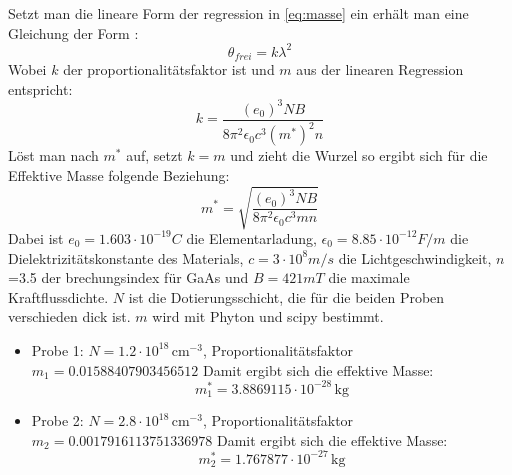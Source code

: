 Setzt man die lineare Form der regression in \eqref{eq:masse} ein erhält man eine Gleichung der Form :
\begin{equation}
    \theta_{frei}=k\lambda^2
\end{equation}
Wobei $k$ der proportionalitätsfaktor ist und $m$ aus der linearen Regression entspricht:
\begin{equation}
    k=\frac{(e_0)^3NB}{8\pi^2\epsilon_0 c^3(m^*)^2 n}
\end{equation}
Löst man nach $m^*$ auf, setzt $k=m$ und zieht die Wurzel so ergibt sich für die Effektive Masse 
folgende Beziehung:
\begin{equation}
    m^*=\sqrt{\frac{(e_0)^3NB}{8\pi^2 \epsilon_0 c^3 m n}}
\end{equation}   
Dabei ist $e_0=1.603\cdot10^{-19}C$ die Elementarladung, $\epsilon_0=8.85\cdot10^{-12}F/m$ die Dielektrizitätskonstante des Materials,
$c=3\cdot10^8 m/s$ die Lichtgeschwindigkeit, $n$=3.5 der brechungsindex für GaAs und $B= 421 mT$ die maximale Kraftflussdichte.
$N$ ist die Dotierungsschicht, die für die beiden Proben verschieden dick ist.
$m$ wird mit Phyton und scipy bestimmt.

\begin{itemize} 
    \item Probe 1: \(N = 1.2 \cdot 10^{18} \, \text{cm}^{-3}\), Proportionalitätsfaktor \(m_1 = 0.01588407903456512\)
Damit ergibt sich die effektive Masse:
\begin{equation} m^*_1 = 3.8869115 \cdot 10^{-28} \, \text{kg}
\end{equation}
\item Probe 2: \(N = 2.8 \cdot 10^{18} \, \text{cm}^{-3}\), Proportionalitätsfaktor \(m_2 = 0.0017916113751336978\)
Damit ergibt sich die effektive Masse:
\begin{equation} m^*_2 = 1.767877 \cdot 10^{-27} \, \text{kg} 
\end{equation} 
\end{itemize}

    
    














